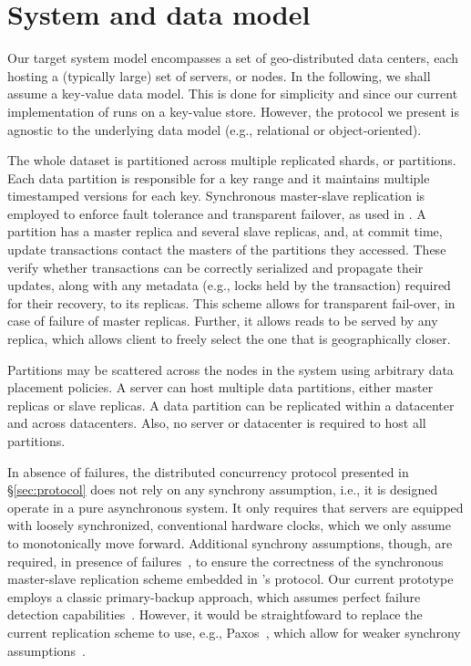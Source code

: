 \section{System  and data  model}
\label{sec:overview}

Our target system model encompasses a set of geo-distributed data centers, each hosting a (typically large) set of servers, or nodes. 
In the following, we shall assume a key-value data model. This is done for simplicity and since  our current implementation of \specula runs on a key-value store. However, the protocol we present  is agnostic to the underlying data model (e.g., relational or object-oriented). 

The whole dataset is partitioned across multiple replicated shards, or partitions.
Each data partition is responsible for a key range and it maintains multiple timestamped versions for each key.  Synchronous master-slave replication is employed to enforce fault tolerance and transparent failover, as used in \cite{spanner, baker2011megastore}. A partition has a master replica and several slave replicas, and, at commit time, update transactions contact the masters of the partitions they accessed. These verify whether transactions can be correctly serialized  and propagate their updates, along with any metadata (e.g., locks held by the transaction) required for their recovery, to its replicas.
This scheme allows for transparent fail-over, in case of failure of master replicas. Further, it allows reads to be served by any replica, which allows client to freely select the one that is geographically closer.


Partitions may be scattered across the nodes in the system using arbitrary data placement policies. A server can host multiple data partitions, either master replicas or slave replicas. A data partition can be replicated within a datacenter and across datacenters. Also, no server or datacenter is required to host all partitions. 

In absence of failures, the distributed concurrency protocol presented in \S \ref{sec:protocol} does not rely on any synchrony assumption, i.e., it is designed operate in a pure asynchronous system. It only requires that  servers are equipped with loosely synchronized, conventional hardware clocks, which we only assume to monotonically move forward. Additional synchrony assumptions, though, are required,  in presence of failures~\cite{fischer1985impossibility}, to ensure the correctness of the synchronous master-slave replication scheme embedded in \specula's protocol. Our current prototype employs a classic primary-backup approach, which assumes perfect failure detection capabilities~\cite{chandra1996unreliable}. However, it would be straightfoward to replace the current replication scheme to use, e.g., Paxos~\cite{lamport2005generalized}, which  allow for weaker synchrony assumptions~\cite{dwork1988consensus}.


